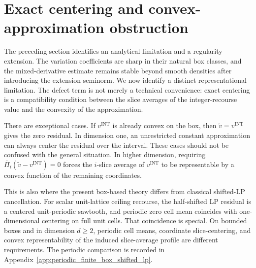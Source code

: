 \documentclass[11pt,letterpaper]{article}
\theoremstyle{definition}
\theoremstyle{remark}
\newcommand{\INT}{\mathrm{INT}}
\begin{document}
\section{Exact centering and convex-approximation obstruction}
\label{sec:exact_centering_obstruction}

The preceding section identifies an analytical limitation and a regularity
extension. The variation coefficients are sharp in their natural box classes,
and the mixed-derivative estimate remains stable beyond smooth densities after
introducing the extension seminorm. We now identify a distinct
representational limitation. The defect term is not merely a technical
convenience: exact centering is a compatibility condition between the slice
averages of the integer-recourse value and the convexity of the approximation.

There are exceptional cases. If $v^{\INT}$ is already convex on the box, then
$\widetilde v=v^{\INT}$ gives the zero residual. In dimension one, an
unrestricted constant approximation can always center the residual over the
interval. These cases should not be confused with the general situation. In
higher dimension, requiring
$\bar\Pi_i(\widetilde v-v^{\INT})=0$ forces the $i$-slice average of
$v^{\INT}$ to be representable by a convex function of the remaining
coordinates.

This is also where the present box-based theory differs from classical
shifted-LP cancellation. For scalar unit-lattice ceiling recourse, the
half-shifted LP residual is a centered unit-periodic sawtooth, and periodic
zero cell mean coincides with one-dimensional centering on full unit cells.
That coincidence is special. On bounded boxes and in dimension $d\ge2$,
periodic cell means, coordinate slice-centering, and convex representability
of the induced slice-average profile are different requirements. The periodic
comparison is recorded in Appendix~\ref{app:periodic_finite_box_shifted_lp}.
\end{document}
